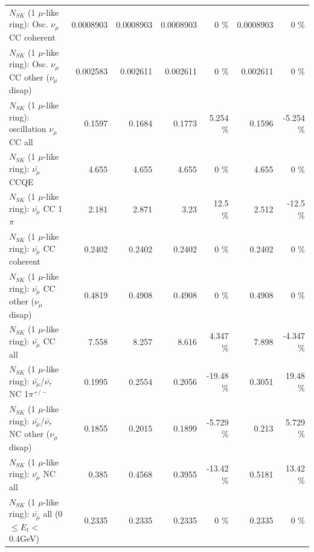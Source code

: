 \begin{table}
\begin{tabular}{| l | r | r | r  r | r  r |}
                        $N_{SK}$ (1 $\mu$-like ring): Osc. $\nu_\mu$ CC coherent &       0.0008903 &       0.0008903 &       0.0008903 &        0 \%  &       0.0008903 &        0 \%  \\ 
         $N_{SK}$ (1 $\mu$-like ring): Osc. $\nu_\mu$ CC other ($\nu_\mu$ disap) &        0.002583 &        0.002611 &        0.002611 &        0 \%  &        0.002611 &        0 \%  \\ 
                      $N_{SK}$ (1 $\mu$-like ring): oscillation $\nu_\mu$ CC all &          0.1597 &          0.1684 &          0.1773 &    5.254 \%  &          0.1596 &   -5.254 \%  \\ 
\hline
\hline
                              $N_{SK}$ (1 $\mu$-like ring): $\bar{\nu_\mu}$ CCQE &           4.655 &           4.655 &           4.655 &        0 \%  &           4.655 &        0 \%  \\ 
                         $N_{SK}$ (1 $\mu$-like ring): $\bar{\nu_\mu}$ CC 1$\pi$ &           2.181 &           2.871 &            3.23 &     12.5 \%  &           2.512 &    -12.5 \%  \\ 
                       $N_{SK}$ (1 $\mu$-like ring): $\bar{\nu_\mu}$ CC coherent &          0.2402 &          0.2402 &          0.2402 &        0 \%  &          0.2402 &        0 \%  \\ 
        $N_{SK}$ (1 $\mu$-like ring): $\bar{\nu_\mu}$ CC other ($\nu_\mu$ disap) &          0.4819 &          0.4908 &          0.4908 &        0 \%  &          0.4908 &        0 \%  \\ 
                          $N_{SK}$ (1 $\mu$-like ring): $\bar{\nu_{\mu}}$ CC all &           7.558 &           8.257 &           8.616 &    4.347 \%  &           7.898 &   -4.347 \%  \\ 
\hline
  $N_{SK}$ (1 $\mu$-like ring): $\bar{\nu_\mu}$/$\bar{\nu_\tau}$ NC 1$\pi^{+/-}$ &          0.1995 &          0.2554 &          0.2056 &   -19.48 \%  &          0.3051 &    19.48 \%  \\ 
$N_{SK}$ (1 $\mu$-like ring): $\bar{\nu_\mu}$/$\bar{\nu_\tau}$ NC other ($\nu_\mu$ disap) &          0.1855 &          0.2015 &          0.1899 &   -5.729 \%  &           0.213 &    5.729 \%  \\ 
                          $N_{SK}$ (1 $\mu$-like ring): $\bar{\nu_{\mu}}$ NC all &           0.385 &          0.4568 &          0.3955 &   -13.42 \%  &          0.5181 &    13.42 \%  \\ 
\hline
   $N_{SK}$ (1 $\mu$-like ring): $\bar{\nu_{\mu}}$ all (0 $\leq E_{t} <$ 0.4GeV) &          0.2335 &          0.2335 &          0.2335 &        0 \%  &          0.2335 &        0 \%  \\ 

\end{tabular}
\end{table}
